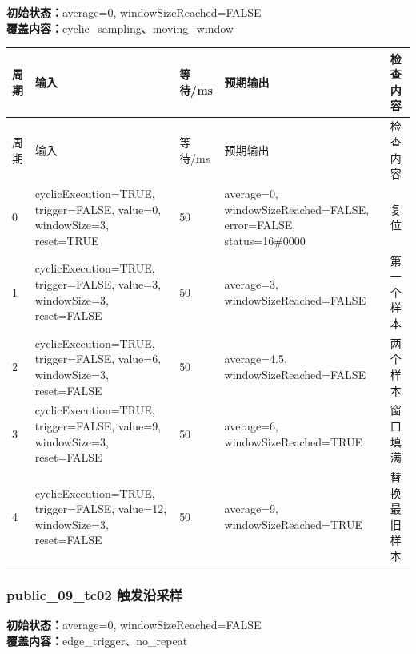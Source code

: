 \noindent\textbf{初始状态：}average=0, windowSizeReached=FALSE\\

\textbf{覆盖内容：}cyclic\_sampling、moving\_window

\begin{longtable}{L{1.0cm}L{4.7cm}L{1.4cm}L{4.0cm}L{2.1cm}}

\toprule

周期 & 输入 & 等待/ms & 预期输出 & 检查内容\\

\midrule

\endfirsthead

\toprule

周期 & 输入 & 等待/ms & 预期输出 & 检查内容\\

\midrule

\endhead

0 & cyclicExecution=TRUE, trigger=FALSE, value=0, windowSize=3, reset=TRUE & 50 & average=0, windowSizeReached=FALSE, error=FALSE, status=16\#0000 & 复位\\

1 & cyclicExecution=TRUE, trigger=FALSE, value=3, windowSize=3, reset=FALSE & 50 & average=3, windowSizeReached=FALSE & 第一个样本\\

2 & cyclicExecution=TRUE, trigger=FALSE, value=6, windowSize=3, reset=FALSE & 50 & average=4.5, windowSizeReached=FALSE & 两个样本\\

3 & cyclicExecution=TRUE, trigger=FALSE, value=9, windowSize=3, reset=FALSE & 50 & average=6, windowSizeReached=TRUE & 窗口填满\\

4 & cyclicExecution=TRUE, trigger=FALSE, value=12, windowSize=3, reset=FALSE & 50 & average=9, windowSizeReached=TRUE & 替换最旧样本\\

\bottomrule

\end{longtable}

\subsubsection{{\ttfamily public\_09\_tc02} 触发沿采样}

\noindent\textbf{初始状态：}average=0, windowSizeReached=FALSE\\

\textbf{覆盖内容：}edge\_trigger、no\_repeat

